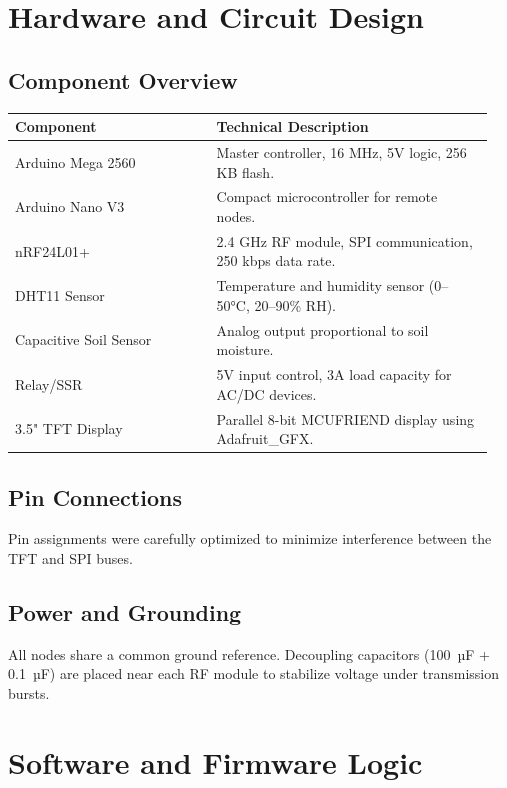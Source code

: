 \documentclass[12pt,a4paper]{article}
\begin{document}
\clearpage
\section{Hardware and Circuit Design}

\subsection{Component Overview}
\begin{longtable}{@{}p{0.4\linewidth}p{0.55\linewidth}@{}}
\toprule
\textbf{Component} & \textbf{Technical Description} \\ \midrule
Arduino Mega 2560 & Master controller, 16 MHz, 5V logic, 256 KB flash. \\
Arduino Nano V3 & Compact microcontroller for remote nodes. \\
nRF24L01+ & 2.4 GHz RF module, SPI communication, 250 kbps data rate. \\
DHT11 Sensor & Temperature and humidity sensor (0–50°C, 20–90\% RH). \\
Capacitive Soil Sensor & Analog output proportional to soil moisture. \\
Relay/SSR & 5V input control, 3A load capacity for AC/DC devices. \\
3.5" TFT Display & Parallel 8-bit MCUFRIEND display using Adafruit\_GFX. \\
\bottomrule
\end{longtable}

\subsection{Pin Connections}
Pin assignments were carefully optimized to minimize interference between the TFT and SPI buses.

\subsection{Power and Grounding}
All nodes share a common ground reference. Decoupling capacitors (100~µF + 0.1~µF) are placed near each RF module to stabilize voltage under transmission bursts.

\clearpage
\section{Software and Firmware Logic}
\end{document}
